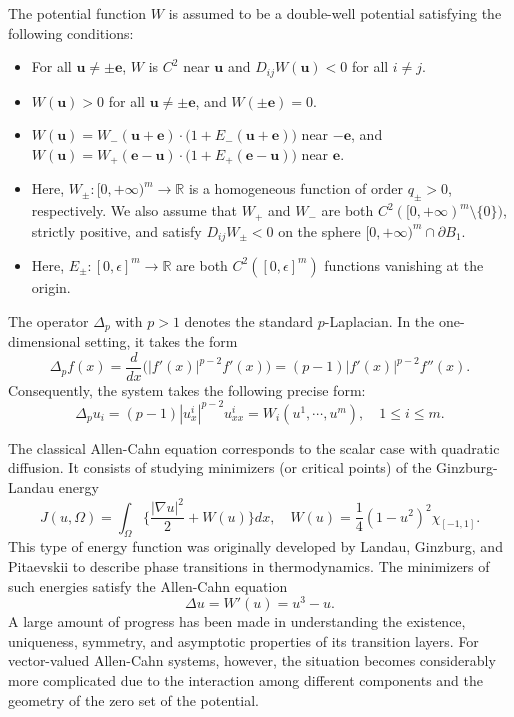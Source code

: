 \documentclass[11pt,twoside,reqno]{amsart}
\newcounter{assu}
\numberwithin{equation}{section}
\begin{document}
The potential function $W$ is assumed to be a double-well potential satisfying the following conditions:
\begin{itemize}
    \item[(A1)] For all $\mathbf{u}\neq\pm\mathbf{e}$, $W$ is $C^{2}$ near $\mathbf{u}$ and $D_{ij}W(\mathbf{u})<0$ for all $i\neq j$.
    \item[(A2)] $W(\mathbf{u})>0$ for all $\mathbf{u}\neq\pm\mathbf{e}$, and $W(\pm\mathbf{e})=0$.
    \item[(A3)] $W(\mathbf{u})=W_{-}(\mathbf{u}+\mathbf{e})\cdot\Big(1+E_{-}(\mathbf{u}+\mathbf{e})\Big)$ near $-\mathbf{e}$, and $W(\mathbf{u})=W_{+}(\mathbf{e}-\mathbf{u})\cdot\Big(1+E_{+}(\mathbf{e}-\mathbf{u})\Big)$ near $\mathbf{e}$.
    \item[(A4)] Here, $W_{\pm}:[0,+\infty)^{m}\to\mathbb{R}$ is a homogeneous function of order $q_{\pm}>0 $, respectively. We also assume that $W_{+}$ and $W_{-}$ are both $C^{2}([0,+\infty)^{m}\setminus\{0\})$, strictly positive, and satisfy $D_{ij}W_{\pm}<0$ on the sphere $[0,+\infty)^{m}\cap\partial B_{1}$.
    \item[(A5)] Here, $E_{\pm}:[0,\epsilon]^{m}\to\mathbb{R}$ are both $C^{2}([0,\epsilon]^{m})$ functions vanishing at the origin.
\end{itemize}
The operator $\Delta_{p}$ with $p>1$ denotes the standard $p$-Laplacian. In the one-dimensional setting, it takes the form
\begin{equation*}
    \Delta_{p}f(x)=\frac{d}{dx}\Big(|f'(x)|^{p-2}f'(x)\Big)=(p-1)|f'(x)|^{p-2}f''(x).
\end{equation*}
Consequently, the system takes the following precise form:
\begin{equation}\label{eq. GP equation}
    \Delta_{p}u_{i}=(p-1)|u^{i}_{x}|^{p-2}u^{i}_{xx}=W_{i}(u^{1},\cdots,u^{m}),\quad1\leq i\leq m.
\end{equation}

The classical Allen-Cahn equation corresponds to the scalar
case with quadratic diffusion. It consists of studying minimizers (or critical points) of the Ginzburg-Landau energy
\begin{equation*}
    J(u,\Omega)=\int_{\Omega}\Big\{\frac{|\nabla u|^{2}}{2}+W(u)\Big\}dx,\quad W(u)=\frac{1}{4}(1-u^{2})^{2}\chi_{[-1,1]}.
\end{equation*}
This type of energy function was originally developed by Landau, Ginzburg, and Pitaevskii \cite{GP58,Landau37,Landau67}  to describe phase transitions in thermodynamics. The minimizers of such energies satisfy the Allen-Cahn equation $$\Delta u=W'(u)=u^{3}-u.$$ A large amount of progress has been made in understanding the existence, uniqueness, symmetry, and asymptotic properties of its transition layers. For vector-valued Allen-Cahn systems, however, the situation becomes considerably more complicated due to the interaction among different components and the geometry of the zero set of the potential.
\end{document}
